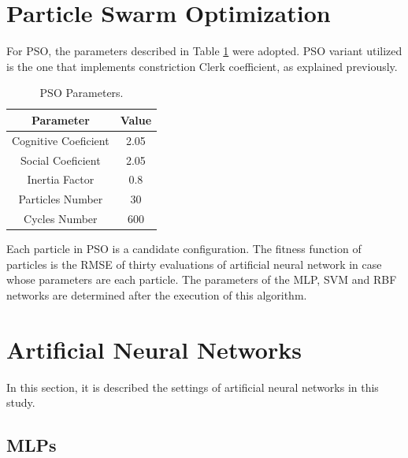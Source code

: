 \section{Particle Swarm Optimization}

For PSO, the parameters described in Table \ref{tab:pso_configuration} were adopted. PSO variant utilized is the one that implements constriction Clerk coefficient, as explained previously.

\begin{table}[h]
\caption{PSO Parameters.}\label{tab:pso_configuration} \centering
\begin{tabular}{|c|c|}
  \hline
  Parameter & Value \\
  \hline
  Cognitive Coeficient & 2.05 \\
  \hline
  Social Coeficient & 2.05 \\
  \hline
  Inertia Factor & 0.8 \\
  \hline
  Particles Number & 30 \\
  \hline
  Cycles Number & 600 \\
  \hline
\end{tabular}
\end{table}

Each particle in PSO is a candidate configuration. The fitness function of particles is the RMSE of thirty evaluations of artificial neural network in case whose parameters are each particle. The parameters of the MLP, SVM and RBF networks are determined after the execution of this algorithm.

\section{Artificial Neural Networks}
\label{sec:rnas}

In this section, it is described the settings of artificial neural networks in this study.

\subsection{MLPs}

